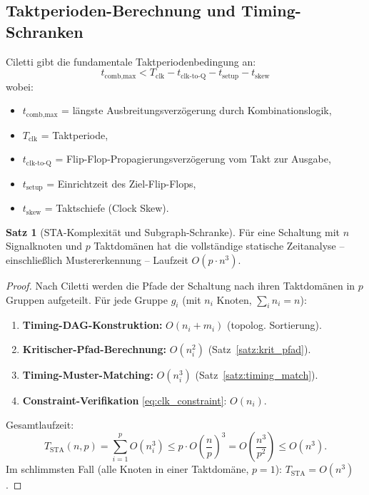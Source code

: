 ﻿\documentclass[a4paper,12pt]{article}
\theoremstyle{definition}
\newtheorem{satz}{Satz}
\begin{document}
\subsection{Taktperioden-Berechnung und Timing-Schranken}

Ciletti \cite[S.~801--803]{ciletti2011} gibt die fundamentale Taktperiodenbedingung an:
\begin{equation}\label{eq:clk_constraint}
  t_{\text{comb,max}} < T_{\text{clk}} - t_{\text{clk-to-Q}} - t_{\text{setup}} - t_{\text{skew}}
\end{equation}
wobei:
\begin{itemize}
  \item $t_{\text{comb,max}}$ = längste Ausbreitungsverzögerung durch Kombinationslogik,
  \item $T_{\text{clk}}$ = Taktperiode,
  \item $t_{\text{clk-to-Q}}$ = Flip-Flop-Propagierungsverzögerung vom Takt zur Ausgabe,
  \item $t_{\text{setup}}$ = Einrichtzeit des Ziel-Flip-Flops,
  \item $t_{\text{skew}}$ = Taktschiefe (Clock Skew).
\end{itemize}

\begin{satz}[STA-Komplexität und Subgraph-Schranke]\label{satz:sta_complexity}
  Für eine Schaltung mit $n$ Signalknoten und $p$ Taktdomänen hat die vollständige
  statische Zeitanalyse -- einschließlich Mustererkennung -- Laufzeit $O(p \cdot n^3)$.
\end{satz}

\begin{proof}
  Nach Ciletti \cite[S.~800]{ciletti2011} werden die Pfade der Schaltung nach ihren
  Taktdomänen in $p$ Gruppen aufgeteilt. Für jede Gruppe $g_i$ (mit $n_i$ Knoten,
  $\sum_i n_i = n$):

  \begin{enumerate}
    \item \textbf{Timing-DAG-Konstruktion:} $O(n_i + m_i)$ (topolog. Sortierung).
    \item \textbf{Kritischer-Pfad-Berechnung:} $O(n_i^2)$ (Satz~\ref{satz:krit_pfad}).
    \item \textbf{Timing-Muster-Matching:} $O(n_i^3)$ (Satz~\ref{satz:timing_match}).
    \item \textbf{Constraint-Verifikation} \eqref{eq:clk_constraint}: $O(n_i)$.
  \end{enumerate}

  Gesamtlaufzeit:
  \[
    T_{\text{STA}}(n,p) = \sum_{i=1}^{p} O(n_i^3) \leq p \cdot O\!\left(\frac{n}{p}\right)^3
    = O\!\left(\frac{n^3}{p^2}\right) \leq O(n^3).
  \]
  Im schlimmsten Fall (alle Knoten in einer Taktdomäne, $p=1$): $T_{\text{STA}} = O(n^3)$.
\end{proof}
\end{document}
